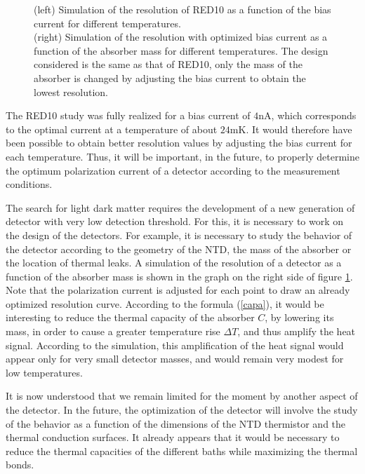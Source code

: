 \begin{figure}[!ht]
\begin{minipage}{0.49\textwidth}
\end{minipage}
\caption{(left) Simulation of the resolution of RED10 as a function of the bias current for different temperatures. \\ (right) Simulation of the resolution with optimized bias current as a function of the absorber mass for different temperatures. The design considered is the same as that of RED10, only the mass of the absorber is changed by adjusting the bias current to obtain the lowest resolution.}
\label{optim}
\end{figure}

The RED10 study was fully realized for a bias current of $4$nA, which corresponds to the optimal current at a temperature of about $24$mK. It would therefore have been possible to obtain better resolution values by adjusting the bias current for each temperature. Thus, it will be important, in the future, to properly determine the optimum polarization current of a detector according to the measurement conditions.

The search for light dark matter requires the development of a new generation of detector with very low detection threshold. For this, it is necessary to work on the design of the detectors. For example, it is necessary to study the behavior of the detector according to the geometry of the NTD, the mass of the absorber or the location of thermal leaks. A simulation of the resolution of a detector as a function of the absorber mass is shown in the graph on the right side of figure \ref{optim}. Note that the polarization current is adjusted for each point to draw an already optimized resolution curve. According to the formula (\ref{capa}), it would be interesting to reduce the thermal capacity of the absorber $C$, by lowering its mass, in order to cause a greater temperature rise $\Delta T$, and thus amplify the heat signal. According to the simulation, this amplification of the heat signal would appear only for very small detector masses, and would remain very modest for low temperatures. 

It is now understood that we remain limited for the moment by another aspect of the detector. In the future, the optimization of the detector will involve the study of the behavior as a function of the dimensions of the NTD thermistor and the thermal conduction surfaces. It already appears that it would be necessary to reduce the thermal capacities of the different baths while maximizing the thermal bonds. 

